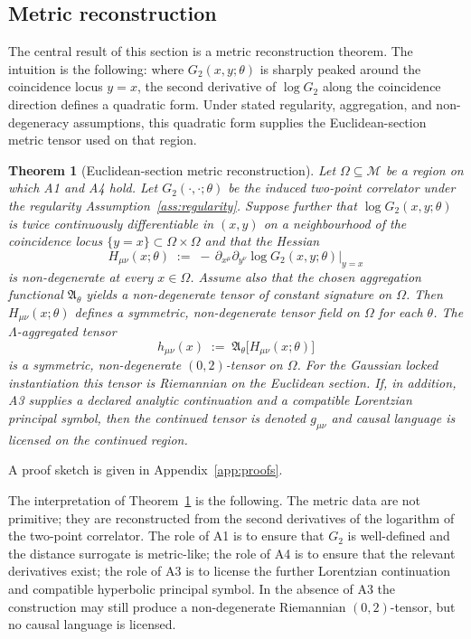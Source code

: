 ﻿\documentclass[12pt,a4paper]{article}
\newtheorem{theorem}{Theorem}
\theoremstyle{definition}
\begin{document}
\subsection{Metric reconstruction}
\label{sec:metric_reconstruction}

The central result of this section is a metric reconstruction theorem. The intuition is the following: where $G_2(x,y;\theta)$ is sharply peaked around the coincidence locus $y = x$, the second derivative of $\log G_2$ along the coincidence direction defines a quadratic form. Under stated regularity, aggregation, and non-degeneracy assumptions, this quadratic form supplies the Euclidean-section metric tensor used on that region.

\begin{theorem}[Euclidean-section metric reconstruction]
\label{thm:metric}
Let $\Omega \subseteq \mathcal{M}$ be a region on which A1 and A4 hold. Let $G_2(\cdot,\cdot;\theta)$ be the induced two-point correlator under the regularity Assumption~\ref{ass:regularity}. Suppose further that $\log G_2(x,y;\theta)$ is twice continuously differentiable in $(x,y)$ on a neighbourhood of the coincidence locus $\{y = x\} \subset \Omega \times \Omega$ and that the Hessian
\[
H_{\mu\nu}(x;\theta) \;:=\; -\,\partial_{x^\mu}\partial_{y^\nu} \log G_2(x,y;\theta)\Big|_{y=x}
\]
is non-degenerate at every $x \in \Omega$. Assume also that the chosen aggregation functional $\mathfrak{A}_\theta$ yields a non-degenerate tensor of constant signature on $\Omega$. Then $H_{\mu\nu}(x;\theta)$ defines a symmetric, non-degenerate tensor field on $\Omega$ for each $\theta$. The $\Lambda$-aggregated tensor
\[
h_{\mu\nu}(x) \;:=\; \mathfrak{A}_\theta \big[ H_{\mu\nu}(x;\theta) \big]
\]
is a symmetric, non-degenerate $(0,2)$-tensor on $\Omega$. For the Gaussian locked instantiation this tensor is Riemannian on the Euclidean section. If, in addition, A3 supplies a declared analytic continuation and a compatible Lorentzian principal symbol, then the continued tensor is denoted $g_{\mu\nu}$ and causal language is licensed on the continued region.
\end{theorem}

A proof sketch is given in Appendix~\ref{app:proofs}.

The interpretation of Theorem~\ref{thm:metric} is the following. The metric data are not primitive; they are reconstructed from the second derivatives of the logarithm of the two-point correlator. The role of A1 is to ensure that $G_2$ is well-defined and the distance surrogate is metric-like; the role of A4 is to ensure that the relevant derivatives exist; the role of A3 is to license the further Lorentzian continuation and compatible hyperbolic principal symbol. In the absence of A3 the construction may still produce a non-degenerate Riemannian $(0,2)$-tensor, but no causal language is licensed.
\end{document}
